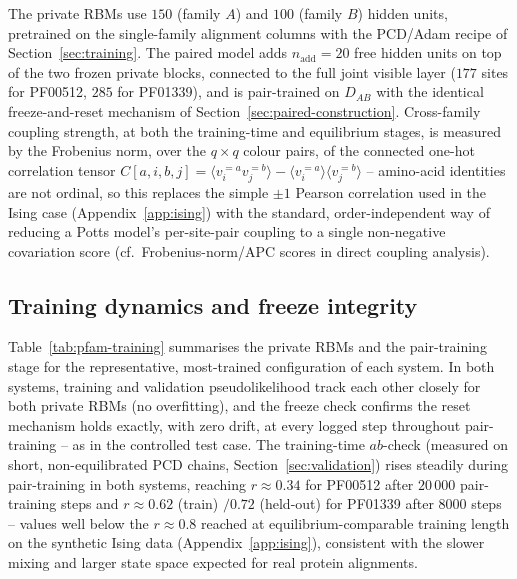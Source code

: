 \documentclass[11pt]{article}
\newcommand{\DAB}{D_{AB}}
\begin{document}
The private RBMs use $150$ (family $A$) and $100$ (family $B$) hidden
units, pretrained on the single-family alignment columns with the
PCD/Adam recipe of Section~\ref{sec:training}. The paired model adds
$n_{\mathrm{add}}=20$ free hidden units on top of the two frozen private
blocks, connected to the full joint visible layer ($177$ sites for
PF00512, $285$ for PF01339), and is pair-trained on $\DAB$ with the
identical freeze-and-reset mechanism of
Section~\ref{sec:paired-construction}. Cross-family coupling strength, at
both the training-time and equilibrium stages, is measured by the
Frobenius norm, over the $q\times q$ colour pairs, of the connected
one-hot correlation tensor
$C[a,i,b,j]=\langle v_i^{=a} v_j^{=b}\rangle-\langle v_i^{=a}\rangle\langle
v_j^{=b}\rangle$ -- amino-acid identities are not ordinal, so this
replaces the simple $\pm1$ Pearson correlation used in the Ising case
(Appendix~\ref{app:ising}) with the standard, order-independent way of
reducing a Potts model's per-site-pair coupling to a single non-negative
covariation score (cf.\ Frobenius-norm/APC scores in direct coupling
analysis).

\subsection{Training dynamics and freeze integrity}

Table~\ref{tab:pfam-training} summarises the private RBMs and the
pair-training stage for the representative, most-trained configuration of
each system. In both systems, training and validation pseudolikelihood
track each other closely for both private RBMs (no overfitting), and the
freeze check confirms the reset mechanism holds exactly, with zero drift,
at every logged step throughout pair-training -- as in the controlled
test case. The training-time $ab$-check (measured on short, non-equilibrated
PCD chains, Section~\ref{sec:validation}) rises steadily during
pair-training in both systems, reaching $r\approx0.34$ for PF00512 after
$20\,000$ pair-training steps and $r\approx0.62$ (train) $/0.72$ (held-out)
for PF01339 after $8000$ steps -- values well below the $r\approx0.8$
reached at equilibrium-comparable training length on the synthetic Ising
data (Appendix~\ref{app:ising}), consistent with the slower mixing and
larger state space expected for real protein alignments.
\end{document}
